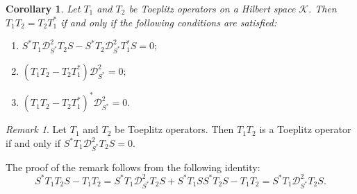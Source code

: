 \documentclass[12pt, reqno]{amsart}
\newtheorem{corollary}[theorem]{Corollary}
\theoremstyle{definition}
\theoremstyle{remark}
\newtheorem{remark}[theorem]{Remark}
\numberwithin{equation}{section}
\newcommand{\ck}{\mathcal{K}}
\begin{document}
    \begin{corollary}\label{T1T2T2T1*}
        Let $T_1$ and $T_2$ be Toeplitz operators on a Hilbert space $\ck.$ Then $T_1T_2=T_2T_1^*$ if and only if the following conditions are satisfied:
        \begin{enumerate}
            \item $S^*T_1\mathcal{D}^2_{S^*}T_2S-S^*T_2\mathcal{D}^2_{S^*}T_1^*S=0;$\label{t1}
            \item $(T_1T_2-T_2T_1^*)\mathcal{D}^2_{S^*}=0;$\label{t2}
            \item $(T_1T_2-T_2T_1^*)^*\mathcal{D}^2_{S^*}=0.$\label{t3}
        \end{enumerate}
    \end{corollary}
    \begin{remark}
        Let $T_1$ and $T_2$ be Toeplitz operators. Then $T_1T_2$ is a Toeplitz operator if and only if $S^*T_1\mathcal{D}^2_{S^*}T_2S=0.$
     \end{remark}
        The proof of the remark follows from the following identity: 
        \begin{equation*}
            S^*T_1T_2S-T_1T_2=S^*T_1\mathcal{D}^2_{S^*}T_2S+S^*T_1SS^*T_2S-T_1T_2=S^*T_1\mathcal{D}^2_{S^*}T_2S.
        \end{equation*}
    
\end{document}
